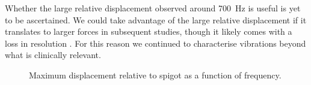 Whether the large relative displacement observed around \SI{700}{Hz} is useful is yet to be ascertained.
We could take advantage of the large relative displacement if it translates to larger forces in subsequent studies, though it likely comes with a loss in resolution \cite{rosenbaum-chou_development_2016}.
For this reason we continued to characterise vibrations beyond what is clinically relevant.
\begin{figure}[h] \centering
{}
\caption{Maximum displacement relative to spigot as a function of frequency.}
\label{fig:normalisation}
\end{figure}
